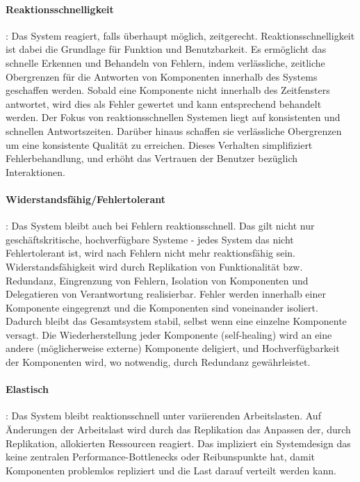 \paragraph{Reaktionsschnelligkeit}: Das System reagiert, falls überhaupt möglich, zeitgerecht. Reaktionsschnelligkeit ist dabei die Grundlage für Funktion und
Benutzbarkeit. Es ermöglicht das schnelle Erkennen und Behandeln von Fehlern, indem verlässliche, zeitliche Obergrenzen für die Antworten von
Komponenten innerhalb des Systems geschaffen werden. Sobald eine Komponente nicht innerhalb des Zeitfensters antwortet, wird dies als Fehler gewertet und kann
entsprechend behandelt werden.
Der Fokus von reaktionsschnellen Systemen liegt auf konsistenten und schnellen Antwortszeiten. Darüber hinaus schaffen sie
verlässliche Obergrenzen um eine konsistente Qualität zu erreichen.
Dieses Verhalten simplifiziert Fehlerbehandlung, und erhöht das Vertrauen der Benutzer bezüglich Interaktionen.

\paragraph{Widerstandsfähig/Fehlertolerant}: Das System bleibt auch bei Fehlern reaktionsschnell. Das gilt nicht nur geschäftskritische, hochverfügbare Systeme -
jedes System das nicht Fehlertolerant ist, wird nach Fehlern nicht mehr reaktionsfähig sein.
Widerstandsfähigkeit wird durch Replikation von Funktionalität bzw. Redundanz, Eingrenzung von Fehlern, Isolation von Komponenten und
Delegatieren von Verantwortung realisierbar.
Fehler werden innerhalb einer Komponente eingegrenzt und die Komponenten sind voneinander isoliert. Dadurch bleibt das Gesamtsystem stabil, selbst
wenn eine einzelne Komponente versagt.
Die Wiederherstellung jeder Komponente (self-healing) wird an eine andere (möglicherweise externe) Komponente deligiert, und
Hochverfügbarkeit der Komponenten wird, wo notwendig, durch Redundanz gewährleistet.

\paragraph{Elastisch}: Das System bleibt reaktionsschnell unter variierenden Arbeitslasten. Auf Änderungen der Arbeitslast wird durch das Replikation
das Anpassen der, durch Replikation, allokierten Ressourcen reagiert. Das impliziert ein Systemdesign das keine zentralen Performance-Bottlenecks oder
Reibunspunkte hat, damit Komponenten problemlos repliziert und die Last darauf verteilt werden kann.

